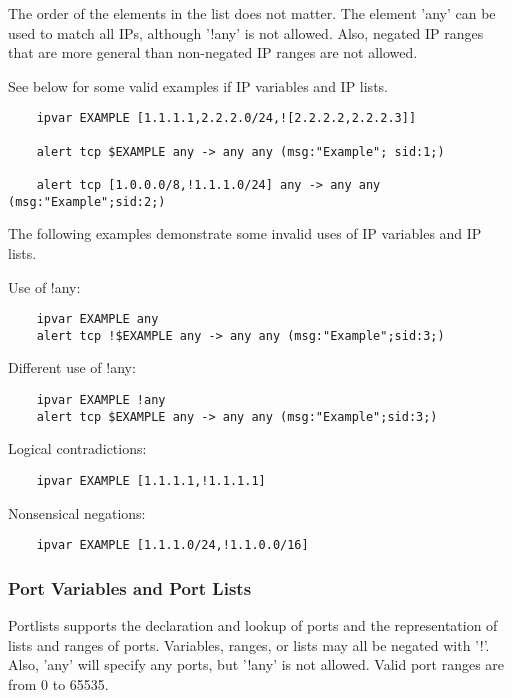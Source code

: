 \documentclass[english]{report}
\begin{document}
The order of the elements in the list does not matter.  The element 'any' can
be used to match all IPs, although '!any' is not allowed.  Also, negated IP
ranges that are more general than non-negated IP ranges are not allowed.  

See below for some valid examples if IP variables and IP lists.

\begin{verbatim}
    ipvar EXAMPLE [1.1.1.1,2.2.2.0/24,![2.2.2.2,2.2.2.3]] 
    
    alert tcp $EXAMPLE any -> any any (msg:"Example"; sid:1;)

    alert tcp [1.0.0.0/8,!1.1.1.0/24] any -> any any (msg:"Example";sid:2;)
\end{verbatim}

The following examples demonstrate some invalid uses of IP variables and IP
lists.

Use of !any:

\begin{verbatim}
    ipvar EXAMPLE any
    alert tcp !$EXAMPLE any -> any any (msg:"Example";sid:3;)
\end{verbatim}

Different use of !any:

\begin{verbatim}
    ipvar EXAMPLE !any
    alert tcp $EXAMPLE any -> any any (msg:"Example";sid:3;)
\end{verbatim}
        
Logical contradictions:

\begin{verbatim}
    ipvar EXAMPLE [1.1.1.1,!1.1.1.1]
\end{verbatim}

Nonsensical negations:

\begin{verbatim}
    ipvar EXAMPLE [1.1.1.0/24,!1.1.0.0/16]
\end{verbatim}


\subsubsection{Port Variables and Port Lists}

Portlists supports the declaration and lookup of ports and the representation
of lists and ranges of ports.  Variables, ranges, or lists may all be negated
with '!'.  Also, 'any' will specify any ports, but '!any' is not allowed.
Valid port ranges are from 0 to 65535.
\end{document}
